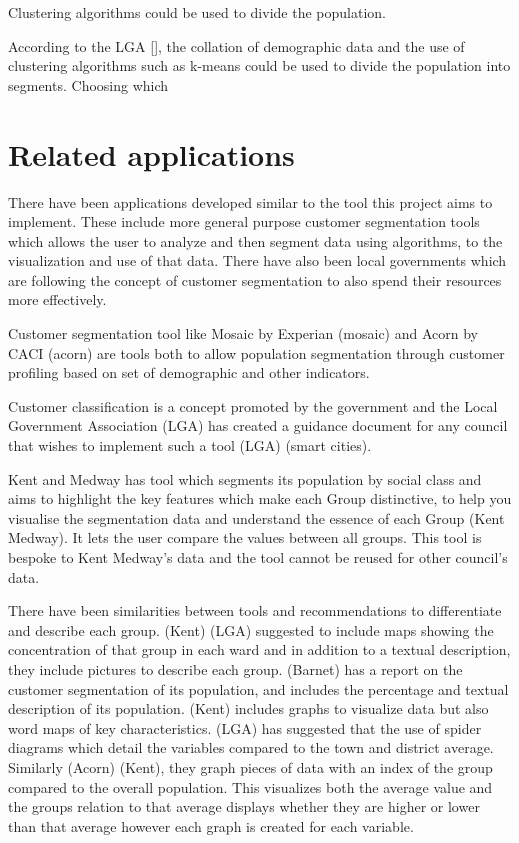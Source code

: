 Clustering algorithms could be used to divide the population.\par
 
According to the LGA [], the collation of demographic data and the use of clustering algorithms such as k-means could be used to divide the population into segments. Choosing which \par


\section{Related applications}

There have been applications developed similar to the tool this project aims to implement. These include more general purpose customer segmentation tools which allows the user to analyze and then segment data using algorithms, to the visualization and use of that data. There have also been local governments which are following the concept of customer segmentation to also spend their resources more effectively.\par

Customer segmentation tool like Mosaic by Experian (mosaic) and Acorn by CACI (acorn) are tools both to allow population segmentation through customer profiling based on set of demographic and other indicators.\par

Customer classification is a concept promoted by the government and the Local Government Association (LGA) has created a guidance document for any council that wishes to implement such a tool (LGA) (smart cities). \par

Kent and Medway has tool which segments its population by social class and aims to highlight the key features which make each Group distinctive, to help you visualise the segmentation data and understand the essence of each Group (Kent  Medway). It lets the user compare the values between all groups. This tool is bespoke to Kent  Medway’s data and the tool cannot be reused for other council’s data.\par

There have been similarities between tools and recommendations to differentiate and describe each group. (Kent) (LGA) suggested to include maps showing the concentration of that group in each ward and in addition to a textual description, they include pictures to describe each group. (Barnet) has a report on the customer segmentation of its population, and includes the percentage and textual description of its population. (Kent) includes graphs to visualize data but also word maps of key characteristics. (LGA) has suggested that the use of spider diagrams which detail the variables compared to the town and district average. Similarly (Acorn) (Kent), they graph pieces of data with an index of the group compared to the overall population. This visualizes both the average value and the groups relation to that average displays whether they are higher or lower than that average however each graph is created for each variable.\par

